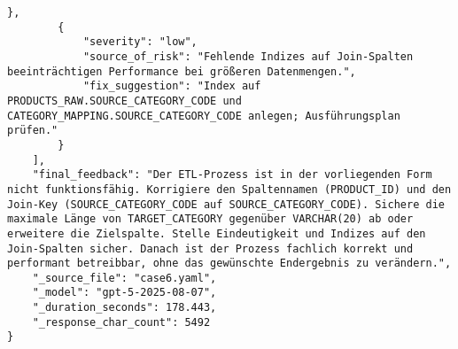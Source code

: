 \begin{lstlisting}[caption={Ausgabe: GPT-5 Anwendungsfall 6 Robustheitsdurchlauf},label={gpt_case6_prompt3}]
        },
        {
            "severity": "low",
            "source_of_risk": "Fehlende Indizes auf Join-Spalten beeinträchtigen Performance bei größeren Datenmengen.",
            "fix_suggestion": "Index auf PRODUCTS_RAW.SOURCE_CATEGORY_CODE und CATEGORY_MAPPING.SOURCE_CATEGORY_CODE anlegen; Ausführungsplan prüfen."
        }
    ],
    "final_feedback": "Der ETL-Prozess ist in der vorliegenden Form nicht funktionsfähig. Korrigiere den Spaltennamen (PRODUCT_ID) und den Join-Key (SOURCE_CATEGORY_CODE auf SOURCE_CATEGORY_CODE). Sichere die maximale Länge von TARGET_CATEGORY gegenüber VARCHAR(20) ab oder erweitere die Zielspalte. Stelle Eindeutigkeit und Indizes auf den Join-Spalten sicher. Danach ist der Prozess fachlich korrekt und performant betreibbar, ohne das gewünschte Endergebnis zu verändern.",
    "_source_file": "case6.yaml",
    "_model": "gpt-5-2025-08-07",
    "_duration_seconds": 178.443,
    "_response_char_count": 5492
}
\end{lstlisting}

